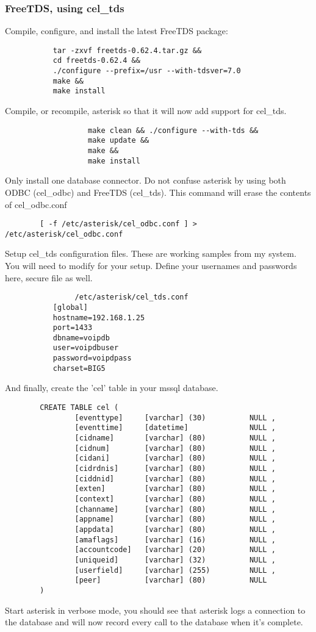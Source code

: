 \subsubsection{FreeTDS, using cel_tds}
		Compile, configure, and install the latest FreeTDS package:
\begin{verbatim}
		   tar -zxvf freetds-0.62.4.tar.gz &&
		   cd freetds-0.62.4 &&
		   ./configure --prefix=/usr --with-tdsver=7.0
		   make &&
		   make install
\end{verbatim}
                Compile, or recompile, asterisk so that it will now add support
                for cel_tds.
\begin{verbatim}
                   make clean && ./configure --with-tds &&
                   make update &&
                   make &&
                   make install
\end{verbatim}
                Only install one database connector.  Do not confuse asterisk
                by using both ODBC (cel_odbc) and FreeTDS (cel_tds).
                This command will erase the contents of cel_odbc.conf
\begin{verbatim}
		[ -f /etc/asterisk/cel_odbc.conf ] > /etc/asterisk/cel_odbc.conf
\end{verbatim}
                Setup cel_tds configuration files.  These are working samples
                from my system.  You will need to modify for your setup. Define
                your usernames and passwords here, secure file as well.
\begin{verbatim}
                /etc/asterisk/cel_tds.conf
		   [global]
		   hostname=192.168.1.25
		   port=1433
		   dbname=voipdb
		   user=voipdbuser
		   password=voipdpass
		   charset=BIG5
\end{verbatim}
                And finally, create the 'cel' table in your mssql database.
\begin{verbatim}
		CREATE TABLE cel (
				[eventtype]     [varchar] (30)          NULL ,
		        [eventtime]     [datetime]              NULL ,
		        [cidname]       [varchar] (80)          NULL ,
		        [cidnum]        [varchar] (80)          NULL ,
		        [cidani]        [varchar] (80)          NULL ,
		        [cidrdnis]      [varchar] (80)          NULL ,
		        [ciddnid]       [varchar] (80)          NULL ,
		        [exten]         [varchar] (80)          NULL ,
		        [context]       [varchar] (80)          NULL ,
		        [channame]      [varchar] (80)          NULL ,
		        [appname]       [varchar] (80)          NULL ,
		        [appdata]       [varchar] (80)          NULL ,
		        [amaflags]      [varchar] (16)          NULL ,
		        [accountcode]   [varchar] (20)          NULL ,
		        [uniqueid]      [varchar] (32)          NULL ,
		        [userfield]     [varchar] (255)         NULL ,
		        [peer]          [varchar] (80)          NULL
		)
\end{verbatim}
                Start asterisk in verbose mode, you should see that asterisk
                logs a connection to the database and will now record every
                call to the database when it's complete.


